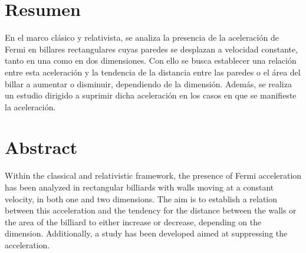\chapter*{Resumen}

En el marco clásico y relativista, se analiza la presencia de la aceleración de Fermi en billares rectangulares cuyas paredes se desplazan a velocidad constante, tanto en una como en dos dimensiones. Con ello se busca establecer una relación entre esta aceleración y la tendencia de la distancia entre las paredes o el área del billar a aumentar o disminuir, dependiendo de la dimensión. Además, se realiza un estudio dirigido a suprimir dicha aceleración en los casos en que se manifieste la aceleración.

\vspace{5cm}


{\let\clearpage\relax\chapter*{Abstract}}

Within the classical and relativistic framework, the presence of Fermi acceleration has been analyzed in rectangular billiards with walls moving at a constant velocity, in both one and two dimensions. The aim is to establish a relation between this acceleration and the tendency for the distance between the walls or the area of the billiard to either increase or decrease, depending on the dimension. Additionally, a study has been developed aimed at suppressing the acceleration.







